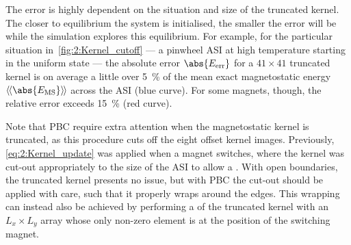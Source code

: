 The error is highly dependent on the situation and size of the truncated kernel.
The closer to equilibrium the system is initialised, the smaller the error will be while the simulation explores this equilibrium.
For example, for the particular situation in~\cref{fig:2:Kernel_cutoff} --- a pinwheel ASI at high temperature starting in the uniform state --- the absolute error $\abs{E_\mathrm{err}}$ for a $41 \times 41$ truncated kernel is on average a little over \SI{5}{\percent} of the mean exact magnetostatic energy $\llangle \abs{E_\mathrm{MS}} \rrangle$ across the ASI (blue curve).
For some magnets, though, the relative error exceeds \SI{15}{\percent} (red curve). \par
Note that PBC require extra attention when the magnetostatic kernel is truncated, as this procedure cuts off the eight offset kernel images.
Previously, \cref{eq:2:Kernel_update} was applied when a magnet switches, where the kernel was cut-out appropriately to the size of the ASI to allow a .
With open boundaries, the truncated kernel presents no issue, but with PBC the cut-out should be applied with care, such that it properly wraps around the edges.
This wrapping can instead also be achieved by performing a  of the truncated kernel with an $L_x \times L_y$ array whose only non-zero element is at the position of the switching magnet.

